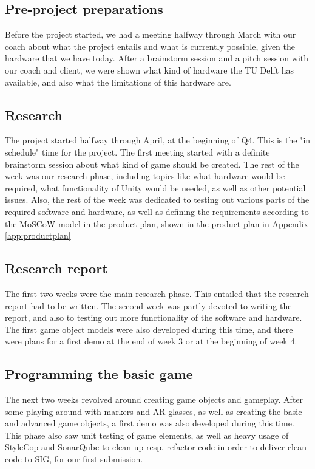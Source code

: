       \subsection{Pre-project preparations} \label{ssec:preparations}
      Before the project started, we had a meeting halfway through March
      with our coach about what the project entails and what is currently
      possible, given the hardware that we have today. After a brainstorm
      session and a pitch session with our coach and client, we were shown 
      what kind of hardware the TU Delft has available, and also what the 
      limitations of this hardware are.
      
      \subsection{Research} \label{ssec:research}
      The project started halfway through April, at the beginning of Q4.
      This is the "in schedule" time for the project. The first meeting
      started with a definite brainstorm session about what kind of game
      should be created. The rest of the week was our research phase, including
      topics like what hardware would be required, what functionality of Unity 
      would be needed, as well as other potential issues. Also, the rest of the 
      week was dedicated to testing out various parts of the required software 
      and hardware, as well as defining the requirements according to the MoSCoW 
      model in the product plan, shown in the product plan in Appendix \ref{app:productplan}
      
      \subsection{Research report} \label{ssec:researchreport}
      The first two weeks were the main research phase. This entailed that the
      research report had to be written. The second week was partly devoted
      to writing the report, and also to testing out more functionality of
      the software and hardware. The first game object models were also
      developed during this time, and there were plans for a first demo at the end
      of week 3 or at the beginning of week 4.
      
      \subsection{Programming the basic game} \label{ssec:basics}
      The next two weeks revolved around creating game objects and gameplay.
      After some playing around with markers and AR glasses, as well as
      creating the basic and advanced game objects, a first demo was also
      developed during this time. This phase also saw unit testing of game
      elements, as well as heavy usage of StyleCop and SonarQube to clean up
      resp. refactor code in order to deliver clean code to SIG, for our first
      submission.
      
